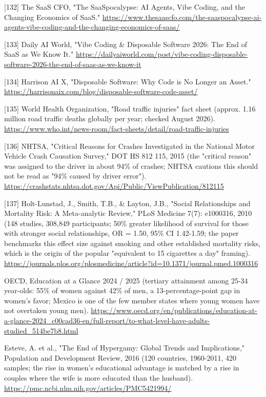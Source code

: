 \documentclass[11pt,a4paper]{article}
\begin{document}
[132] The SaaS CFO, "The SaaSpocalypse: AI Agents, Vibe Coding, and the Changing Economics of SaaS." \url{https://www.thesaascfo.com/the-saaspocalypse-ai-agents-vibe-coding-and-the-changing-economics-of-saas/}

[133] Daily AI World, "Vibe Coding \& Disposable Software 2026: The End of SaaS as We Know It." \url{https://dailyaiworld.com/post/vibe-coding-disposable-software-2026-the-end-of-saas-as-we-know-it}

[134] Harrison AI X, "Disposable Software: Why Code is No Longer an Asset." \url{https://harrisonaix.com/blog/disposable-software-code-asset/}

[135] World Health Organization, "Road traffic injuries" fact sheet (approx. 1.16 million road traffic deaths globally per year; checked August 2026). \url{https://www.who.int/news-room/fact-sheets/detail/road-traffic-injuries}

[136] NHTSA, "Critical Reasons for Crashes Investigated in the National Motor Vehicle Crash Causation Survey," DOT HS 812 115, 2015 (the "critical reason" was assigned to the driver in about 94\% of crashes; NHTSA cautions this should not be read as "94\% caused by driver error"). \url{https://crashstats.nhtsa.dot.gov/Api/Public/ViewPublication/812115}

[137] Holt-Lunstad, J., Smith, T.B., \& Layton, J.B., "Social Relationships and Mortality Risk: A Meta-analytic Review," PLoS Medicine 7(7): e1000316, 2010 (148 studies, 308,849 participants; 50\% greater likelihood of survival for those with stronger social relationships, OR = 1.50, 95\% CI 1.42-1.59; the paper benchmarks this effect size against smoking and other established mortality risks, which is the origin of the popular "equivalent to 15 cigarettes a day" framing). \url{https://journals.plos.org/plosmedicine/article?id=10.1371/journal.pmed.1000316}

\noindent [142] OECD, Education at a Glance 2024 / 2025 (tertiary attainment among 25-34 year-olds: 55\% of women against 42\% of men, a 13-percentage-point gap in women's favor; Mexico is one of the few member states where young women have not overtaken young men). \url{https://www.oecd.org/en/publications/education-at-a-glance-2024\_c00cad36-en/full-report/to-what-level-have-adults-studied\_514be7b8.html}

\noindent [143] Esteve, A. et al., "The End of Hypergamy: Global Trends and Implications," Population and Development Review, 2016 (120 countries, 1960-2011, 420 samples; the rise in women's educational advantage is matched by a rise in couples where the wife is more educated than the husband). \url{https://pmc.ncbi.nlm.nih.gov/articles/PMC5421994/}
\end{document}
